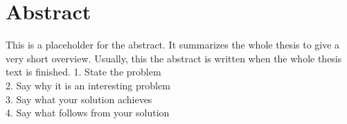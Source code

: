 \chapter*{Abstract}
This is a placeholder for the abstract. It summarizes the whole thesis
to give a very short overview. Usually, this the abstract is written
when the whole thesis text is finished.
1. State the problem\\
2. Say why it is  an interesting problem\\
3. Say what your solution achieves\\
4. Say what follows from your solution\\  
\newpage\null\thispagestyle{empty}\newpage
